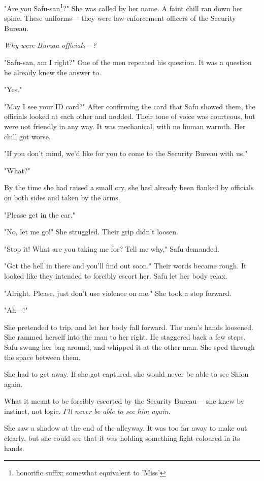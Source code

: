 "Are you Safu-san\footnote{honorific suffix; somewhat equivalent to 'Miss'}?" She was called by her name. A faint chill ran down
her spine. These uniforms--- they were law enforcement officers of the
Security Bureau.

\emph{Why were Bureau officials---?}

"Safu-san, am I right?" One of the men repeated his question. It was a
question he already knew the answer to.

"Yes."

"May I see your ID card?" After confirming the card that Safu showed
them, the officials looked at each other and nodded. Their tone of voice
was courteous, but were not friendly in any way. It was mechanical, with
no human warmth. Her chill got worse.

"If you don't mind, we'd like for you to come to the Security Bureau
with us."

"What?"

By the time she had raised a small cry, she had already been flanked by
officials on both sides and taken by the arms.

"Please get in the car."

"No, let me go!" She struggled. Their grip didn't loosen.

"Stop it! What are you taking me for? Tell me why," Safu demanded.

"Get the hell in there and you'll find out soon." Their words became
rough. It looked like they intended to forcibly escort her. Safu let her
body relax.

"Alright. Please, just don't use violence on me." She took a step
forward.

"Ah---!"

She pretended to trip, and let her body fall forward. The men's hands
loosened. She rammed herself into the man to her right. He staggered
back a few steps. Safu swung her bag around, and whipped it at the other
man. She sped through the space between them.

She had to get away. If she got captured, she would never be able to see
Shion again.

What it meant to be forcibly escorted by the Security Bureau--- she knew
by instinct, not logic. \emph{I'll never be able to see him again.}

She saw a shadow at the end of the alleyway. It was too far away to make
out clearly, but she could see that it was holding something
light-coloured in its hands.

